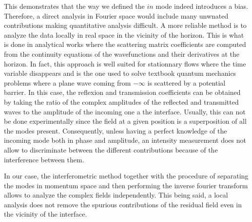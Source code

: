 This demonstrates that the way we defined the $in$ mode indeed introduces a bias. Therefore, a direct analysis in Fourier space would include many unwnated contributions making quantitative analysis difficult. 
A more reliable method is to analyze the data locally in real space in the vicinity of the horizon. This is what is done in analytical works \cite{Recati_acousticHR_2009,carusotto_fluidlightproposal_2012} where the scattering matrix coefficients are computed from the continuity equations of the wavefunctions and their derivatives at the horizon. In fact, this approach is well suited for stationnary flows where the time variable disappears and is the one 
used to solve textbook quantum mechanics problems \cite{CCT_tome1} where a plane wave coming from $-\infty$ is scattered by a potential barrier. In this case, the reflexion and transmission coefficients can be obtained by taking the ratio of the complex amplitudes of the reflected and transmitted waves to the amplitude of the incoming one a the interface. Usually,
this can not be done experimentally since the field at a given position is a superposition of all the modes present. Consequently, unless having a perfect knowledge of the incoming mode both in phase and amplitude, an intensity 
measurement does not allow to discriminate between the different contributions because of the interference between them.


In our case, the interferometric method together with the procedure of separating the modes in momentum space and then performing the inverse fourier transform allows to analyze the complex fields independently. This being said,
a local analysis does not remove the spurious contributions of the residual field even in the vicinity of the interface.


